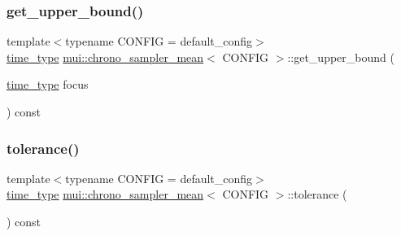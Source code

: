 \mbox{\label{classmui_1_1chrono__sampler__mean_a56e9614147dd1a609b3552cb2b1547ca}} 
\subsubsection{\texorpdfstring{get\+\_\+upper\+\_\+bound()}{get\_upper\_bound()}}
{\footnotesize\ttfamily template$<$typename C\+O\+N\+F\+IG  = default\+\_\+config$>$ \\
\hyperlink{classmui_1_1chrono__sampler__mean_aa818a9c8850aa9fda611430c158a0072}{time\+\_\+type} \hyperlink{classmui_1_1chrono__sampler__mean}{mui\+::chrono\+\_\+sampler\+\_\+mean}$<$ C\+O\+N\+F\+IG $>$\+::get\+\_\+upper\+\_\+bound (\begin{DoxyParamCaption}\item[{\hyperlink{classmui_1_1chrono__sampler__mean_aa818a9c8850aa9fda611430c158a0072}{time\+\_\+type}}]{focus }\end{DoxyParamCaption}) const\hspace{0.3cm}{\ttfamily [inline]}}

\mbox{\label{classmui_1_1chrono__sampler__mean_a371dfebeba7515e4bb3a95f0868411f6}} 
\subsubsection{\texorpdfstring{tolerance()}{tolerance()}}
{\footnotesize\ttfamily template$<$typename C\+O\+N\+F\+IG  = default\+\_\+config$>$ \\
\hyperlink{classmui_1_1chrono__sampler__mean_aa818a9c8850aa9fda611430c158a0072}{time\+\_\+type} \hyperlink{classmui_1_1chrono__sampler__mean}{mui\+::chrono\+\_\+sampler\+\_\+mean}$<$ C\+O\+N\+F\+IG $>$\+::tolerance (\begin{DoxyParamCaption}{ }\end{DoxyParamCaption}) const\hspace{0.3cm}{\ttfamily [inline]}}



